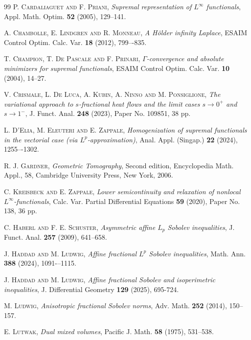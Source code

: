 \documentclass[11pt, reqno]{article}
\theoremstyle{definition}
\numberwithin{equation}{section}
\begin{document}
\begin{thebibliography}{99}
\textsc{P. Cardaliaguet and F. Priani},
\emph{Supremal representation of {$L^\infty$} functionals},
Appl. Math. Optim. \textbf{52} (2005), 129--141.

\textsc{A. Chambolle, E. Lindgren and R. Monneau},
\emph{A H\"older infinity Laplace},
ESAIM Control Optim. Calc. Var. \textbf{18} (2012), 799–-835.

\textsc{T. Champion, T. De Pascale and F. Prinari},
\emph{{$\Gamma$}-convergence and absolute minimizers for supremal functionals},
ESAIM Control Optim. Calc. Var. \textbf{10} (2004), 14--27.


\textsc{V. Crismale, L. De Luca, A. Kubin, A. Ninno and M. Ponsiglione}, 
\emph{The variational approach to {$s$}-fractional heat flows and the limit cases {$s\to0^+$} and {$s\to1^-$}},
J. Funct. Anal. \textbf{248} (2023), Paper No. 109851, 38 pp.

\textsc{L. D'Elia, M. Eleuteri and E. Zappale},
\emph{Homogenization of supremal functionals in the vectorial case (via {$L^p$}-approximation)},
Anal. Appl. (Singap.) \textbf{22} (2024), 1255–-1302.

\textsc{R. J. Gardner},
\emph{Geometric Tomography},
Second edition,
Encyclopedia Math. Appl., 58,
Cambridge University Press, New York, 2006. 

\textsc{C. Kreisbeck and E. Zappale}, 
\emph{Lower semicontinuity and relaxation of nonlocal {$L^\infty$}-functionals},
Calc. Var. Partial Differential Equations \textbf{59} (2020), Paper No. 138, 36 pp.


\textsc{C. Haberl and F. E. Schuster},
\emph{Asymmetric affine $L_p$ Sobolev inequalities},
J. Funct. Anal. \textbf{257} (2009), 641--658. 

\textsc{J. Haddad and M. Ludwig},
\emph{Affine fractional $L^p$ Sobolev inequalities},
Math. Ann. \textbf{388} (2024),  1091-–1115.

\textsc{J. Haddad and M. Ludwig},
\emph{Affine fractional Sobolev and isoperimetric inequalities},
J. Differential Geometry \textbf{129} (2025), 695-724.

\textsc{M. Ludwig},
\emph{Anisotropic fractional Sobolev norms},
Adv. Math. \textbf{252} (2014), 150--157.

\textsc{E. Lutwak},
\emph{Dual mixed volumes},
Pacific J. Math. \textbf{58} (1975), 531--538.


\end{thebibliography}
\end{document}
